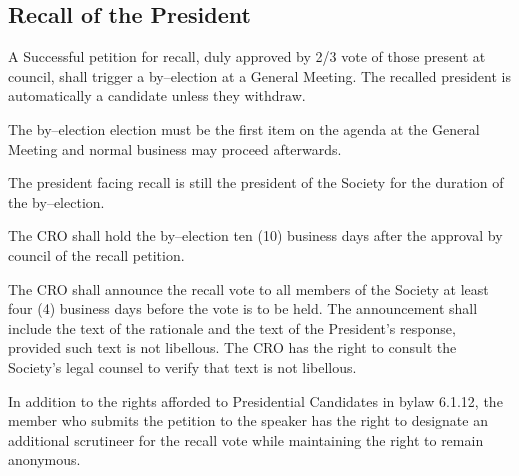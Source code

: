 \subsection{Recall of the President}
\begin{longenum}[ label*=\thesubsection.\arabic*., align=left]
	\item A Successful petition for recall, duly approved by 2/3 vote of those present at council, shall trigger a by--election at a General Meeting. The recalled president is automatically a candidate unless they withdraw.
    \begin{longenum}[ label*=\arabic*., align=left]
		\item The by--election election must be the first item on the agenda at the General Meeting and normal business may proceed afterwards.
	\end{longenum}
	
    \item The president facing recall is still the president of the Society for the duration of the by--election.
    \item The CRO shall hold the by--election ten (10) business days after the approval by council of the recall petition.
    \item The CRO shall announce the recall vote to all members of the Society at least four (4) business days before the vote is to be held. The announcement shall include the text of the rationale and the text of the President's response, provided such text is not libellous. The CRO has the right to consult the Society's legal counsel to verify that text is not libellous.
    \item In addition to the rights afforded to Presidential Candidates in bylaw 6.1.12, the member who submits the petition to the speaker has the right to designate an additional scrutineer for the recall vote while maintaining the right to remain anonymous.
\end{longenum}
